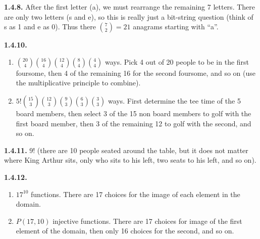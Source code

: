 \documentclass[10pt,]{book}
\theoremstyle{plain}
\theoremstyle{definition}
\theoremstyle{definition}
\theoremstyle{definition}
\theoremstyle{definition}
\numberwithin{equation}{chapter}
\begin{document}
%
\par\smallskip
\noindent\textbf{1.4.8.} \hypertarget{p-960}{}%
After the first letter (a), we must rearrange the remaining 7 letters. There are only two letters (s and e), so this is really just a bit-string question (think of s as 1 and e as 0). Thus there \({7 \choose 2} = 21\) anagrams starting with ``a''.%
\par\smallskip
\noindent\textbf{1.4.10.} \hypertarget{p-965}{}%
\leavevmode%
\begin{enumerate}[label=(\alph*)]
\item\hypertarget{li-452}{}\({20 \choose 4}{16 \choose 4}{12 \choose 4}{8 \choose 4}{4 \choose 4}\) ways. Pick 4 out of 20 people to be in the first foursome, then 4 of the remaining 16 for the second foursome, and so on (use the multiplicative principle to combine).%
\item\hypertarget{li-453}{}\(5!{15 \choose 3}{12 \choose 3}{9 \choose 3}{6 \choose 3}{3 \choose 3}\) ways.  First determine the tee time of the 5 board members, then select 3 of the 15 non board members to golf with the first board member, then 3 of the remaining 12 to golf with the second, and so on.%
\end{enumerate}
%
\par\smallskip
\noindent\textbf{1.4.11.} \hypertarget{p-967}{}%
\(9!\) (there are 10 people seated around the table, but it does not matter where King Arthur sits, only who sits to his left, two seats to his left, and so on).%
\par\smallskip
\noindent\textbf{1.4.12.} \hypertarget{p-971}{}%
\leavevmode%
\begin{enumerate}[label=(\alph*)]
\item\hypertarget{li-456}{}\(17^{10}\) functions.  There are 17 choices for the image of each element in the domain.%
\item\hypertarget{li-457}{}\(P(17, 10)\) injective functions.  There are 17 choices for image of the first element of the domain, then only 16 choices for the second, and so on.%
\end{enumerate}
%
\par\smallskip
\end{document}
